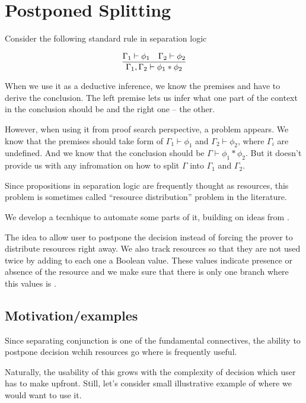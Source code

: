 \chapter{Postponed Splitting}
\label{chap:postponed_splitting}

Consider the following standard rule in separation logic

\[\infer{\Gamma_1, \Gamma_2 \vdash \phi_1 \ast \phi_2}
        {\Gamma_1 \vdash \phi_1 &
         \Gamma_2 \vdash \phi_2} \]

When we use it as a deductive inference, we know the premises and have to derive the conclusion.
The left premise lets us infer what one part of the context in the conclusion should be and the right one -- the other.

However, when using it from proof search perspective, a problem appears.
We know that the premises should take form of \(\Gamma_1 \vdash \phi_1\) and \(\Gamma_2 \vdash \phi_2\), where $\Gamma_i$ are undefined.
And we know that the conclusion should be \(\Gamma \vdash \phi_1 \ast \phi_2\).
But it doesn't provide us with any infromation on how to split \(\Gamma\) into \(\Gamma_1\) and \(\Gamma_2\).

Since propositions in separation logic are frequently thought as resources, this problem is sometimes called ``resource distribution'' problem in the literature.

We develop a tecnhique to automate some parts of it, building on ideas from \citet{harlandResourceDistributionBooleanConstraints2003}.

The idea to allow user to postpone the decision instead of forcing the prover to distribute resources right away.
We also track resources so that they are not used twice by adding to each one a Boolean value.
These values indicate presence or absence of the resource and we make sure that there is only one branch where this values is \true.

\section{Motivation/examples}

Since separating conjunction is one of the fundamental connectives, the ability to postpone decision wchih resources go where is frequently useful.

Naturally, the usability of this grows with the complexity of decision which user has to make upfront.
Still, let's consider small illustrative example of where we would want to use it.

